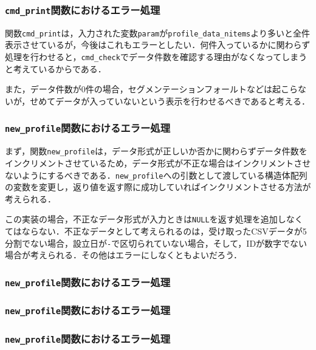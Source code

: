 \documentclass[a4j,11pt]{jarticle}
\begin{document}
\subsubsection{\texttt{cmd\_print}関数におけるエラー処理}
関数\verb|cmd_print|は，入力された変数\verb|param|が\verb|profile_data_nitems|より多いと全件表示させているが，今後はこれもエラーとしたい．何件入っているかに関わらず処理を行わせると，\verb|cmd_check|でデータ件数を確認する理由がなくなってしまうと考えているからである．

また，データ件数が$0$件の場合，セグメンテーションフォールトなどは起こらないが，せめてデータが入っていないという表示を行わせるべきであると考える．
\subsubsection{\texttt{new\_profile}関数におけるエラー処理}

まず，関数\verb|new_profile|は，データ形式が正しいか否かに関わらずデータ件数をインクリメントさせているため，データ形式が不正な場合はインクリメントさせないようにするべきである．\verb|new_profile|への引数として渡している構造体配列の変数を変更し，返り値を返す際に成功していればインクリメントさせる方法が考えられる．

この実装の場合，不正なデータ形式が入力ときは\verb|NULL|を返す処理を追加しなくてはならない．不正なデータとして考えられるのは，受け取ったCSVデータが5分割でない場合，設立日が\verb|-|で区切られていない場合，そして，IDが数字でない場合が考えられる．その他はエラーにしなくともよいだろう．
\subsubsection{\texttt{new\_profile}関数におけるエラー処理}
\subsubsection{\texttt{new\_profile}関数におけるエラー処理}
\subsubsection{\texttt{new\_profile}関数におけるエラー処理}
\end{document}
